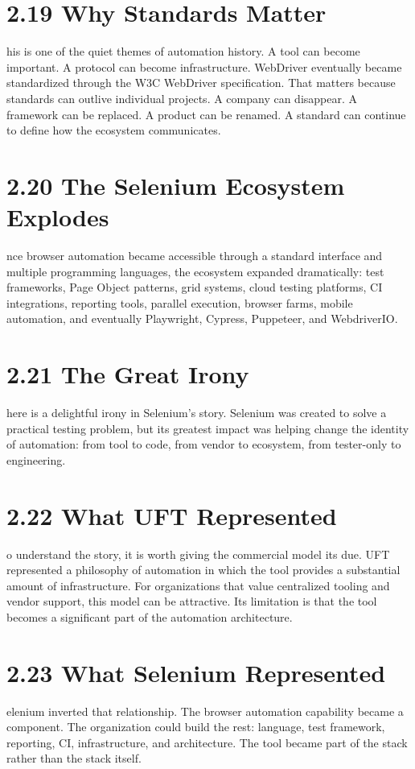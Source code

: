\documentclass[11pt, a4paper, openany]{book}
\newcommand{\initialcap}[1]{{\fontfamily{lmss}\selectfont\huge\textbf{#1}}}
\begin{document}
\section{2.19 Why Standards Matter}
\noindent \initialcap{T}his is one of the quiet themes of automation history. A tool can become important. A protocol can become infrastructure. WebDriver eventually became standardized through the W3C WebDriver specification. That matters because standards can outlive individual projects. A company can disappear. A framework can be replaced. A product can be renamed. A standard can continue to define how the ecosystem communicates.

\section{2.20 The Selenium Ecosystem Explodes}
\noindent \initialcap{O}nce browser automation became accessible through a standard interface and multiple programming languages, the ecosystem expanded dramatically: test frameworks, Page Object patterns, grid systems, cloud testing platforms, CI integrations, reporting tools, parallel execution, browser farms, mobile automation, and eventually Playwright, Cypress, Puppeteer, and WebdriverIO.

\section{2.21 The Great Irony}
\noindent \initialcap{T}here is a delightful irony in Selenium's story. Selenium was created to solve a practical testing problem, but its greatest impact was helping change the identity of automation: from tool to code, from vendor to ecosystem, from tester-only to engineering.

\section{2.22 What UFT Represented}
\noindent \initialcap{T}o understand the story, it is worth giving the commercial model its due. UFT represented a philosophy of automation in which the tool provides a substantial amount of infrastructure. For organizations that value centralized tooling and vendor support, this model can be attractive. Its limitation is that the tool becomes a significant part of the automation architecture.

\section{2.23 What Selenium Represented}
\noindent \initialcap{S}elenium inverted that relationship. The browser automation capability became a component. The organization could build the rest: language, test framework, reporting, CI, infrastructure, and architecture. The tool became part of the stack rather than the stack itself.
\end{document}
